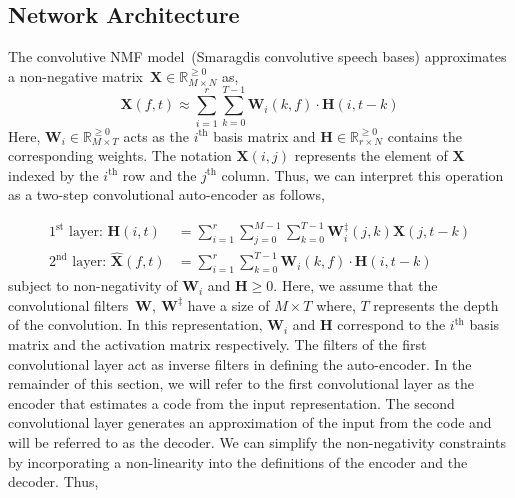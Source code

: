 \documentclass{article}
\begin{document}
\subsection{Network Architecture}
\label{sec:conv-nmf}
The convolutive NMF model~\cite{}(Smaragdis convolutive speech bases) approximates a non-negative matrix~$\mathbf{X}\in \mathbb{R}_{M \times N}^{\geq0}$ as,
\begin{equation}
    \mathbf{X}(f,t) \approx \sum_{i=1}^{r} \sum_{k=0}^{T-1} \mathbf{W}_{i}(k,f)\cdot\mathbf{H}(i,t-k)
\end{equation}
Here, $\mathbf{W}_{i} \in \mathbb{R}_{M \times T}^{\geq0}$ acts as the $i^{\text{th}}$ basis matrix and $\mathbf{H} \in \mathbb{R}_{r \times N}^{\geq0}$ contains the corresponding weights. The notation $\mathbf{X}(i,j)$ represents the element of $\mathbf{X}$ indexed by the $i^{\text{th}}$ row and the $j^{\text{th}}$ column. Thus, we can interpret this operation as a two-step convolutional auto-encoder as follows,

\begin{align}
    \text{$1^{\text{st}}$ layer:~}\mathbf{H}(i,t) &= \sum_{i=1}^{r} \sum_{j=0}^{M-1} \sum_{k=0}^{T-1} \mathbf{W}_{i}^{\ddagger}(j,k)\mathbf{X}(j,t-k) \\
    \text{$2^{\text{nd}}$ layer:~}\hat{\mathbf{X}}(f,t) &= \sum_{i=1}^{r} \sum_{k=0}^{T-1} \mathbf{W}_{i}(k,f)\cdot\mathbf{H}(i,t-k)
    \label{eq:nmfcnncnn}
\end{align}
subject to non-negativity of $\mathbf{W}_{i}$ and $\mathbf{H}\geq0$. Here, we assume that the convolutional filters~$\mathbf{W},~\mathbf{W}^{\ddagger}$ have a size of $M\times T$ where, $T$ represents the depth of the convolution. In this representation, $\mathbf{W}_{i}$ and $\mathbf{H}$ correspond to the $i^{\text{th}}$ basis matrix and the activation matrix respectively. The filters of the first convolutional layer act as inverse filters in defining the auto-encoder. In the remainder of this section, we will refer to the first convolutional layer as the encoder that estimates a code from the input representation. The second convolutional layer generates an approximation of the input from the code and will be referred to as the decoder. We can simplify the non-negativity constraints by incorporating a non-linearity into the definitions of the encoder and the decoder. Thus,
\end{document}
